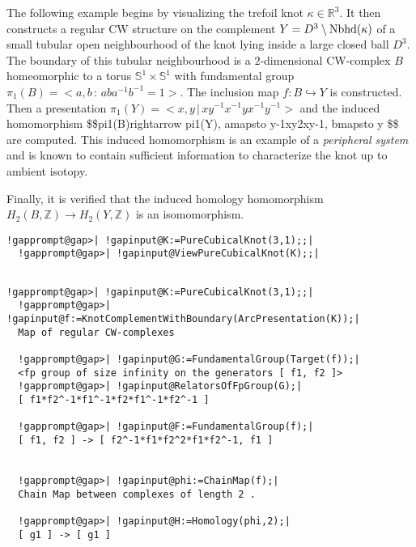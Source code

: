 \documentclass[a4paper,11pt]{report}
\begin{document}
{{ The following example begins by visualizing the trefoil knot $\kappa \in \mathbb R^3$. It then constructs a regular CW structure on the complement $Y= D^3\setminus {\rm Nbhd}(\kappa) $ of a small tubular open neighbourhood of the knot lying inside a large closed
ball $D^3$. The boundary of this tubular neighbourhood is a $2$-dimensional CW-complex $B$ homeomorphic to a torus $\mathbb S^1\times \mathbb S^1$ with fundamental group $\pi_1(B)=<a,b\, :\, aba^{-1}b^{-1}=1>$. The inclusion map $f\colon B\hookrightarrow Y$ is constructed. Then a presentation $\pi_1(Y)= <x,y\, |\, xy^{-1}x^{-1}yx^{-1}y^{-1}>$ and the induced homomorphism
\$\$\texttt{}pi{\textunderscore}1(B)\texttt{}rightarrow
\texttt{}pi{\textunderscore}1(Y), a\texttt{}mapsto
y\texttt{}\texttt{}-1\texttt{}xy\texttt{}2xy\texttt{}\texttt{}-1\texttt{},
b\texttt{}mapsto y \$\$ are computed. This induced homomorphism is
an example of a \emph{peripheral system} and is known to contain sufficient information to characterize the knot up to
ambient isotopy. 

 Finally, it is verified that the induced homology homomorphism $H_2(B,\mathbb Z) \rightarrow H_2(Y,\mathbb Z)$ is an isomomorphism. 
\begin{Verbatim}[commandchars=!@|,fontsize=\small,frame=single,label=Example]
  !gapprompt@gap>| !gapinput@K:=PureCubicalKnot(3,1);;|
  !gapprompt@gap>| !gapinput@ViewPureCubicalKnot(K);;|
  
\end{Verbatim}
  
\begin{Verbatim}[commandchars=!@|,fontsize=\small,frame=single,label=Example]
  !gapprompt@gap>| !gapinput@K:=PureCubicalKnot(3,1);;|
  !gapprompt@gap>| !gapinput@f:=KnotComplementWithBoundary(ArcPresentation(K));|
  Map of regular CW-complexes
  
  !gapprompt@gap>| !gapinput@G:=FundamentalGroup(Target(f));|
  <fp group of size infinity on the generators [ f1, f2 ]>
  !gapprompt@gap>| !gapinput@RelatorsOfFpGroup(G);|
  [ f1*f2^-1*f1^-1*f2*f1^-1*f2^-1 ]
  
  !gapprompt@gap>| !gapinput@F:=FundamentalGroup(f);|
  [ f1, f2 ] -> [ f2^-1*f1*f2^2*f1*f2^-1, f1 ]
  
  
  !gapprompt@gap>| !gapinput@phi:=ChainMap(f);|
  Chain Map between complexes of length 2 . 
  
  !gapprompt@gap>| !gapinput@H:=Homology(phi,2);|
  [ g1 ] -> [ g1 ]
  

\end{Verbatim}}}
\end{document}
